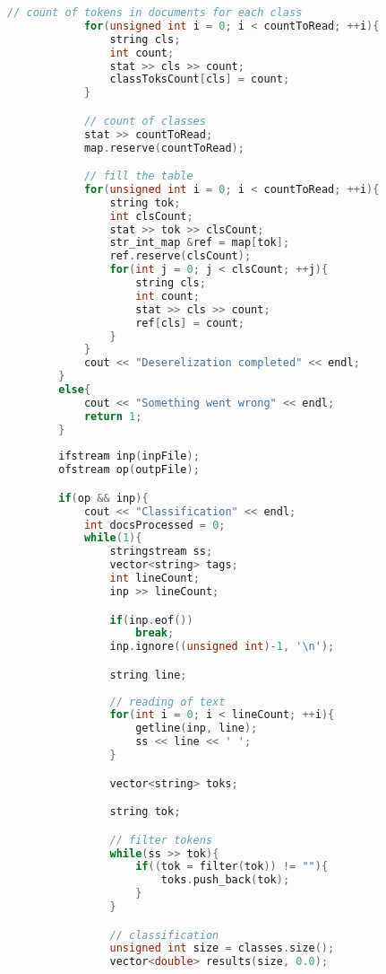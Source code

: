 \documentclass[12pt,a4paper]{scrartcl}
\begin{document}
\begin{lstlisting}[language=C++, basicstyle=\scriptsize]
            // count of tokens in documents for each class
            for(unsigned int i = 0; i < countToRead; ++i){
                string cls;
                int count;
                stat >> cls >> count;
                classToksCount[cls] = count;
            }

            // count of classes
            stat >> countToRead;
            map.reserve(countToRead);

            // fill the table
            for(unsigned int i = 0; i < countToRead; ++i){
                string tok;
                int clsCount;
                stat >> tok >> clsCount;
                str_int_map &ref = map[tok];
                ref.reserve(clsCount);
                for(int j = 0; j < clsCount; ++j){
                    string cls;
                    int count;
                    stat >> cls >> count;
                    ref[cls] = count;
                }
            }
            cout << "Deserelization completed" << endl;
        }
        else{
            cout << "Something went wrong" << endl;
            return 1;
        }
        
        ifstream inp(inpFile);
        ofstream op(outpFile);

        if(op && inp){
            cout << "Classification" << endl;
            int docsProcessed = 0;
            while(1){
                stringstream ss;
                vector<string> tags;
                int lineCount;
                inp >> lineCount;

                if(inp.eof())
                    break;
                inp.ignore((unsigned int)-1, '\n');

                string line;
                
                // reading of text
                for(int i = 0; i < lineCount; ++i){
                    getline(inp, line);
                    ss << line << ' ';
                }

                vector<string> toks;

                string tok;

                // filter tokens
                while(ss >> tok){
                    if((tok = filter(tok)) != ""){
                        toks.push_back(tok);
                    }
                }

                // classification
                unsigned int size = classes.size();
                vector<double> results(size, 0.0);


\end{lstlisting}
\end{document}
